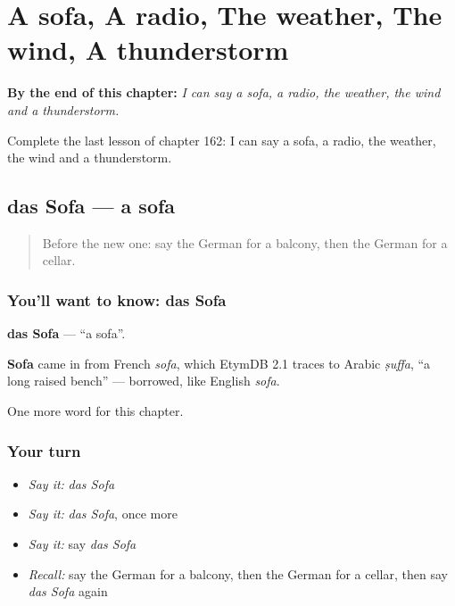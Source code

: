 
\chapter{A sofa, A radio, The weather, The wind, A thunderstorm}
\label{ch:ge-a-sofa-a-radio-the-weather-the-wind-a-thunderstorm}

\begin{chapteropening}
\textbf{By the end of this chapter:} \emph{I can say a sofa, a radio, the weather, the wind and a thunderstorm.}

Complete the last lesson of chapter 162: I can say a sofa, a radio, the weather, the wind and a thunderstorm.
\end{chapteropening}

\section[das Sofa]{das Sofa — a sofa}

\label{lesson:GE-C162-sofa}



\begin{quote}
Before the new one: say the German for a balcony, then the German for a cellar.
\end{quote}

\subsection*{You'll want to know: das Sofa}
\textbf{das Sofa} — \textquotedblleft{}a sofa\textquotedblright{}.

\begin{cousinweb}
\textbf{Sofa} came in from French \emph{sofa}, which EtymDB 2.1 traces to Arabic \emph{ṣuffa}, \textquotedblleft{}a long raised bench\textquotedblright{} — borrowed, like English \emph{sofa}.
\end{cousinweb}

\begin{grammarlens}[title={What you've built}]
One more word for this chapter.
\end{grammarlens}

\subsection*{Your turn}
\begin{itemize}
\raggedright
  \item \emph{Say it:} \emph{das Sofa}
  \item \emph{Say it:} \emph{das Sofa}, once more
  \item \emph{Say it:} say \emph{das Sofa}
  \item \emph{Recall:} say the German for a balcony, then the German for a cellar, then say \emph{das Sofa} again
\end{itemize}

